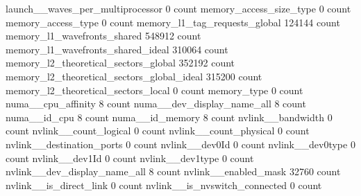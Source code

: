 launch__waves_per_multiprocessor                                                               0 count
memory_access_size_type                                                                        0 count
memory_access_type                                                                             0 count
memory_l1_tag_requests_global                                                             124144 count
memory_l1_wavefronts_shared                                                               548912 count
memory_l1_wavefronts_shared_ideal                                                         310064 count
memory_l2_theoretical_sectors_global                                                      352192 count
memory_l2_theoretical_sectors_global_ideal                                                315200 count
memory_l2_theoretical_sectors_local                                                            0 count
memory_type                                                                                    0 count
numa__cpu_affinity                                                                             8 count
numa__dev_display_name_all                                                                     8 count
numa__id_cpu                                                                                   8 count
numa__id_memory                                                                                8 count
nvlink__bandwidth                                                                              0 count
nvlink__count_logical                                                                          0 count
nvlink__count_physical                                                                         0 count
nvlink__destination_ports                                                                      0 count
nvlink__dev0Id                                                                                 0 count
nvlink__dev0type                                                                               0 count
nvlink__dev1Id                                                                                 0 count
nvlink__dev1type                                                                               0 count
nvlink__dev_display_name_all                                                                   8 count
nvlink__enabled_mask                                                                       32760 count
nvlink__is_direct_link                                                                         0 count
nvlink__is_nvswitch_connected                                                                  0 count
